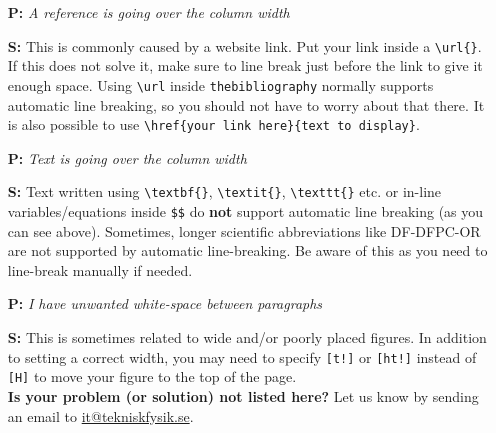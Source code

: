 \documentclass[fleqn,10pt]{SelfArx} %
\begin{document}
\begin{enumerate}[nolistsep]
    \item[\textbf{P:}]  \textit{A reference is going over the column width} 
    \item[\textbf{S:}] This is commonly caused by a website link. Put your link inside a \texttt{\textbackslash url\{\}}. If this does not solve it, make sure to line break just before the link to give it enough space. Using \texttt{\textbackslash url} inside \texttt{thebibliography} normally supports automatic line breaking, so you should not have to worry about that there. It is also possible to use \texttt{\textbackslash href\{your link here\}\{text to display\}}.\\
    
    \item[\textbf{P:}]  \textit{Text is going over the column width}
    \item[\textbf{S:}] Text written using \texttt{\textbackslash textbf\{\}}, \texttt{\textbackslash textit\{\}}, \texttt{\textbackslash texttt\{\}} etc. or in-line variables/equations inside \texttt{\$\$}  do \textbf{not} support automatic line breaking (as you can see above). Sometimes, longer scientific abbreviations like DF-DFPC-OR are not supported by automatic line-breaking. Be aware of this as you need to line-break manually if needed. \\
    
    \item[\textbf{P:}]  \textit{I have unwanted white-space between paragraphs} 
    \item[\textbf{S:}] This is sometimes related to wide and/or poorly placed figures. In addition to setting a correct width, you may need to specify \texttt{[t!]} or \texttt{[ht!]}  instead of \texttt{[H]} to move your figure to the top of the page. \\
    
    \textbf{Is your problem (or solution) not listed here?} Let us know by sending an email to \href{mailto:it@tekniskfysik.se}{it@tekniskfysik.se}.  
\end{enumerate}
\end{document}
